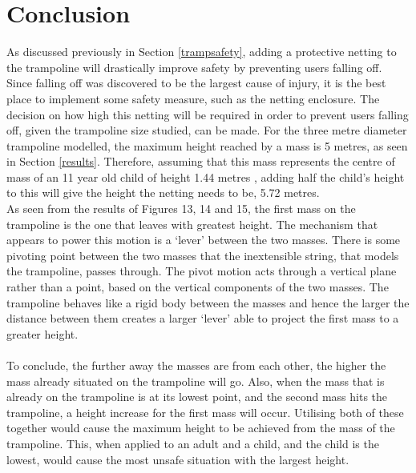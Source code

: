 \section{Conclusion}\label{conclusion}







 \noindent As discussed previously in Section \ref{trampsafety}, adding a protective netting to the trampoline will drastically improve safety by preventing users falling off. Since falling off was discovered to be the largest cause of injury, it is the best place to implement some safety measure, such as the netting enclosure. The decision on how high this netting will be required in order to prevent users falling off, given the trampoline size studied, can be made. For the three metre diameter trampoline modelled, the maximum height reached by a mass is 5 metres, as seen in Section \ref{results}. Therefore, assuming that this mass represents the centre of mass of an 11 year old child of height 1.44 metres \cite{childweight}, adding half the child's height to this will give the height the netting needs to be, 5.72 metres. \\

 



\noindent As seen from the results of Figures 13, 14 and 15, the first mass on the trampoline is the one that leaves with greatest height. The mechanism that appears to power this motion is a `lever' between the two masses. There is some pivoting point between the two masses that the inextensible string, that models the trampoline, passes through. The pivot motion acts through a vertical plane rather than a point, based on the vertical components of the two masses. The trampoline behaves like a rigid body between the masses and hence the larger the distance between them creates a larger `lever' able to project the first mass to a greater height.
\\
\\
\noindent To conclude, the further away the masses are from each other, the higher the mass already situated on the trampoline will go. Also, when the mass that is already on the trampoline is at its lowest point, and the second mass hits the trampoline, a height increase for the first mass will occur. Utilising both of these together would cause the maximum height to be achieved from the mass of the trampoline. This, when applied to an adult and a child, and the child is the lowest, would cause the most unsafe situation with the largest height.  